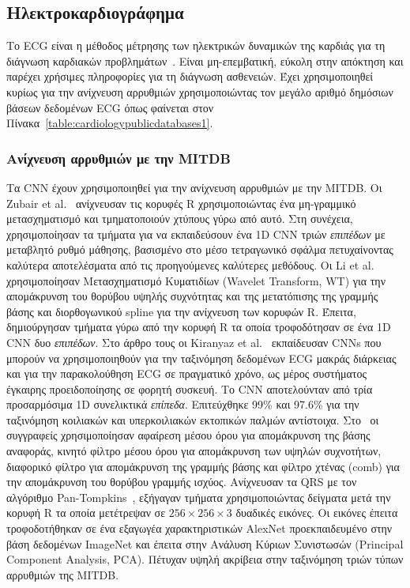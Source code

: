 \begin{sidewaystable}
\begin{tabular}{l c l l}
		\bottomrule
	\end{tabular}
\end{sidewaystable}

\subsection{Ηλεκτροκαρδιογράφημα}
Το ECG είναι η μέθοδος μέτρησης των ηλεκτρικών δυναμικών της καρδιάς για τη διάγνωση καρδιακών προβλημάτων~\cite{badnjevic2017inspection}.
Είναι μη-επεμβατική, εύκολη στην απόκτηση και παρέχει χρήσιμες πληροφορίες για τη διάγνωση ασθενειών.
Έχει χρησιμοποιηθεί κυρίως για την ανίχνευση αρρυθμιών χρησιμοποιώντας τον μεγάλο αριθμό δημόσιων βάσεων δεδομένων ECG όπως φαίνεται στον Πίνακα~\ref{table:cardiologypublicdatabases1}.

\subsubsection{Ανίχνευση αρρυθμιών με την MITDB}
Τα CNN έχουν χρησιμοποιηθεί για την ανίχνευση αρρυθμιών με την MITDB\@.
Οι Zubair et al.~\cite{zubair2016automated} ανίχνευσαν τις κορυφές R χρησιμοποιώντας ένα μη-γραμμικό μετασχηματισμό και τμηματοποιούν χτύπους γύρω από αυτό.
Στη συνέχεια, χρησιμοποίησαν τα τμήματα για να εκπαιδεύσουν ένα 1D CNN τριών \textit{επιπέδων} με μεταβλητό ρυθμό μάθησης, βασισμένο στο μέσο τετραγωνικό σφάλμα πετυχαίνοντας καλύτερα αποτελέσματα από τις προηγούμενες καλύτερες μεθόδους.
Οι Li et al.~\cite{li2017classification} χρησιμοποίησαν Μετασχηματισμό Κυματιδίων (Wavelet Transform, WT) για την απομάκρυνση του θορύβου υψηλής συχνότητας και της μετατόπισης της γραμμής βάσης και διορθογωνικού spline για την ανίχνευση των κορυφών R.
Έπειτα, δημιούργησαν τμήματα γύρω από την κορυφή R τα οποία τροφοδότησαν σε ένα 1D CNN δυο \textit{επιπέδων}.
Στο άρθρο τους οι Kiranyaz et al.~\cite{kiranyaz2016real} εκπαίδευσαν CNNs που μπορούν να χρησιμοποιηθούν για την ταξινόμηση δεδομένων ECG μακράς διάρκειας και για την παρακολούθηση ECG σε πραγματικό χρόνο, ως μέρος συστήματος έγκαιρης προειδοποίησης σε φορητή συσκευή.
Το CNN αποτελούνταν από τρία προσαρμόσιμα 1D συνελικτικά \textit{επίπεδα}.
Επιτεύχθηκε 99\% και 97.6\% για την ταξινόμηση κοιλιακών και υπερκοιλιακών εκτοπικών παλμών αντίστοιχα.
Στο~\cite{isin2017cardiac} οι συγγραφείς χρησιμοποίησαν αφαίρεση μέσου όρου για απομάκρυνση της βάσης αναφοράς, κινητό φίλτρο μέσου όρου για απομάκρυνση των υψηλών συχνοτήτων, διαφορικό φίλτρο για απομάκρυνση της γραμμής βάσης και φίλτρο χτένας (comb) για την απομάκρυνση του θορύβου γραμμής ισχύος.
Ανίχνευσαν τα QRS με τον αλγόριθμο Pan-Tompkins~\cite{pan1985real}, εξήγαγαν τμήματα χρησιμοποιώντας δείγματα μετά την κορυφή R τα οποία μετέτρεψαν σε $256\times 256\times 3$ δυαδικές εικόνες.
Οι εικόνες έπειτα τροφοδοτήθηκαν σε ένα εξαγωγέα χαρακτηριστικών AlexNet προεκπαιδευμένο στην βάση δεδομένων ImageNet και έπειτα στην Ανάλυση Κύριων Συνιστωσών (Principal Component Analysis, PCA).
Πέτυχαν υψηλή ακρίβεια στην ταξινόμηση τριών τύπων αρρυθμιών της MITDB\@.

